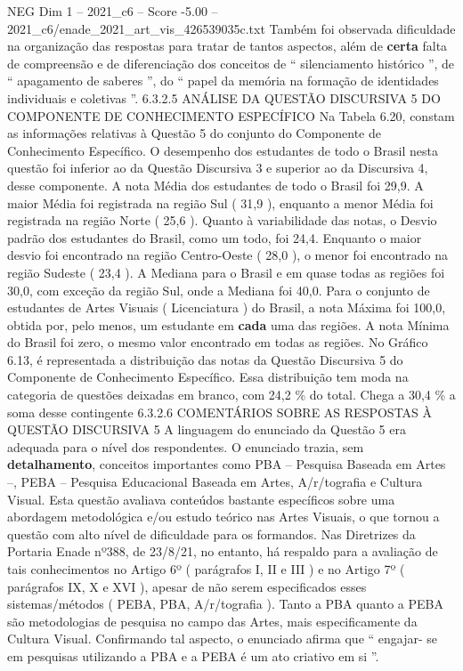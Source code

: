 \begin{textsample}{NEG Dim 1 – 2021\_c6 – Score -5.00 – 2021\_c6/enade\_2021\_art\_vis\_426539035c.txt}
Também foi observada dificuldade na organização das respostas para tratar de tantos aspectos, além de \textbf{certa} falta de compreensão e de diferenciação dos conceitos de “ silenciamento histórico ”, de “ apagamento de saberes ”, do “ papel da memória na formação de identidades individuais e coletivas ”. 6.3.2.5 ANÁLISE DA QUESTÃO DISCURSIVA 5 DO COMPONENTE DE CONHECIMENTO ESPECÍFICO Na Tabela 6.20, constam as informações relativas à Questão 5 do conjunto do Componente de Conhecimento Específico.
O desempenho dos estudantes de todo o Brasil nesta questão foi inferior ao da Questão Discursiva 3 e superior ao da Discursiva 4, desse componente.
A nota Média dos estudantes de todo o Brasil foi 29,9.
A maior Média foi registrada na região Sul ( 31,9 ), enquanto a menor Média foi registrada na região Norte ( 25,6 ).
Quanto à variabilidade das notas, o Desvio padrão dos estudantes do Brasil, como um todo, foi 24,4.
Enquanto o maior desvio foi encontrado na região Centro-Oeste ( 28,0 ), o menor foi encontrado na região Sudeste ( 23,4 ).
A Mediana para o Brasil e em quase todas as regiões foi 30,0, com exceção da região Sul, onde a Mediana foi 40,0.
Para o conjunto de estudantes de Artes Visuais ( Licenciatura ) do Brasil, a nota Máxima foi 100,0, obtida por, pelo menos, um estudante em \textbf{cada} uma das regiões.
A nota Mínima do Brasil foi zero, o mesmo valor encontrado em todas as regiões.
No Gráfico 6.13, é representada a distribuição das notas da Questão Discursiva 5 do Componente de Conhecimento Específico.
Essa distribuição tem moda na categoria de questões deixadas em branco, com 24,2 \% do total.
Chega a 30,4 \% a soma desse contingente 6.3.2.6 COMENTÁRIOS SOBRE AS RESPOSTAS À QUESTÃO DISCURSIVA 5 A linguagem do enunciado da Questão 5 era adequada para o nível dos respondentes.
O enunciado trazia, sem \textbf{detalhamento}, conceitos importantes como PBA – Pesquisa Baseada em Artes –, PEBA – Pesquisa Educacional Baseada em Artes, A/r/tografia e Cultura Visual.
Esta questão avaliava conteúdos bastante específicos sobre uma abordagem metodológica e/ou estudo teórico nas Artes Visuais, o que tornou a questão com alto nível de dificuldade para os formandos.
Nas Diretrizes da Portaria Enade nº388, de 23/8/21, no entanto, há respaldo para a avaliação de tais conhecimentos no Artigo 6º ( parágrafos I, II e III ) e no Artigo 7º ( parágrafos IX, X e XVI ), apesar de não serem especificados esses sistemas/métodos ( PEBA, PBA, A/r/tografia ).
Tanto a PBA quanto a PEBA são metodologias de pesquisa no campo das Artes, mais especificamente da Cultura Visual.
Confirmando tal aspecto, o enunciado afirma que “ engajar- se em pesquisas utilizando a PBA e a PEBA é um ato criativo em si ”.

\end{textsample}
